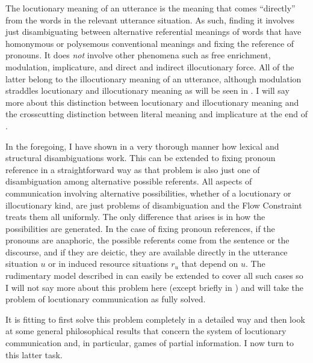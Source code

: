 The locutionary meaning of an utterance is the meaning that comes ``directly'' from the words in the relevant utterance situation. As such, finding it involves just disambiguating between alternative referential meanings of words that have homonymous or polysemous conventional meanings and fixing the reference of pronouns. It does \emph{not} involve other phenomena such as free enrichment, modulation, implicature, and direct and indirect illocutionary force. All of the latter belong to the illocutionary meaning of an utterance, although modulation straddles locutionary and illocutionary meaning as will be seen in . I will say more about this distinction between locutionary and illocutionary meaning and the crosscutting distinction between literal meaning and implicature at the end of .

In the foregoing, I have shown in a very thorough manner how lexical and structural disambiguations work. This can be extended to fixing pronoun reference in a straightforward way as that problem is also just one of disambiguation among alternative possible referents. All aspects of communication involving alternative possibilities, whether of a locutionary or illocutionary kind, are just problems of disambiguation and the Flow Constraint treats them all uniformly. The only difference that arises is in how the possibilities are generated. In the case of fixing pronoun references, if the pronouns are anaphoric, the possible referents come from the sentence or the discourse, and if they are deictic, they are available directly in the utterance situation $u$ or in induced resource situations $r_u$ that depend on $u$. The rudimentary model described in \citet{cp:ga} can easily be extended to cover all such cases so I will not say more about this problem here (except briefly in ) and will take the problem of locutionary communication as fully solved.

It is fitting to first solve this problem completely in a detailed way and then look at some general philosophical results that concern the system of locutionary communication and, in particular, games of partial information. I now turn to this latter task.

